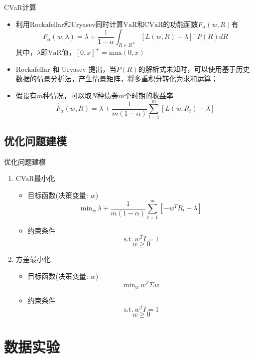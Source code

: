\documentclass[CJK,aspectratio=43]{beamer}  %
\begin{document}
\begin{frame}{CVaR计算}
	\begin{itemize}
		\item 利用Rockafellar和Uryasev同时计算$\text{VaR}$和$\text{CVaR}$的功能函数$F_{\alpha}(w,R)$有
		$$
		F_{\alpha}(w,\lambda)=\lambda+\frac{1}{1-\alpha}\int_{R\in R^N}[L(w,R)-\lambda]^{+}P(R)dR
		$$
		其中，$\lambda$即$\text{VaR}$值，$[0,x]^+=\text{max}(0,x)$
		\item Rockafellar 和 Uryasev 提出，当$P(R)$的解析式未知时，可以使用基于历史数据的情景分析法，产生情景矩阵，将多重积分转化为求和运算；
		\item 假设有$m$种情况，可以取$N$种债券$m$个时期的收益率
		$$
		\widehat{F}_{\alpha}(w,R)=\lambda+\frac{1}{m(1-\alpha)}\sum_{t=1}^{m}[L(w,R_t)-\lambda]
		$$
		\cite{Rong2007}
	\end{itemize}
\end{frame}

\subsection{优化问题建模}
\begin{frame}{优化问题建模}
	\begin{enumerate}
	\item CVaR最小化
		\begin{itemize}	
			\item 目标函数(决策变量: $w$)  \\
			$$
			\text{min}_{w} \ \lambda+\frac{1}{m(1-\alpha)}\sum_{t=1}^{m}[-w^TR_t-\lambda]
			$$
			\item 约束条件 \\
			$$
			\text{s.t.} \ w^TI=1
			$$
			$$
			w \geq 0
			$$
		\end{itemize}
	\item 方差最小化
		\begin{itemize}	
			\item 目标函数(决策变量: $w$) \\
			$$
			\text{min}_{w} \ w^T\Sigma w
			$$
			\item 约束条件 \\
			$$
			\text{s.t.} \ w^TI=1
			$$
			$$
			w \geq 0
			$$
		\end{itemize}
	\end{enumerate}
\end{frame}

\section{数据实验}
\end{document}
